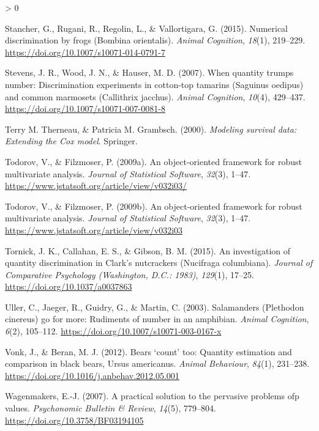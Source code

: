 \documentclass[
  english,
  ,doc,floatsintext]{apa6}
\newlength{\cslhangindent}
\newenvironment{CSLReferences}[2] %
 {%
  \setlength{\parindent}{0pt}
  \ifodd #1 \everypar{\setlength{\hangindent}{\cslhangindent}}\ignorespaces\fi
  \ifnum #2 > 0
  \setlength{\parskip}{#2\baselineskip}
  \fi
 }%
 {}
\begin{document}
\begin{CSLReferences}{1}{0}
\leavevmode\hypertarget{ref-Stancher.etal.2015}{}%
Stancher, G., Rugani, R., Regolin, L., \& Vallortigara, G. (2015). Numerical discrimination by frogs ({Bombina} orientalis). \emph{Animal Cognition}, \emph{18}(1), 219--229. \url{https://doi.org/10.1007/s10071-014-0791-7}

\leavevmode\hypertarget{ref-Stevens.etal.2007}{}%
Stevens, J. R., Wood, J. N., \& Hauser, M. D. (2007). When quantity trumps number: Discrimination experiments in cotton-top tamarins ({Saguinus} oedipus) and common marmosets ({Callithrix} jacchus). \emph{Animal Cognition}, \emph{10}(4), 429--437. \url{https://doi.org/10.1007/s10071-007-0081-8}

\leavevmode\hypertarget{ref-R-survival-book}{}%
Terry M. Therneau, \& Patricia M. Grambsch. (2000). \emph{Modeling survival data: Extending the {C}ox model}. Springer.

\leavevmode\hypertarget{ref-R-robustbase}{}%
Todorov, V., \& Filzmoser, P. (2009a). An object-oriented framework for robust multivariate analysis. \emph{Journal of Statistical Software}, \emph{32}(3), 1--47. \url{https://www.jstatsoft.org/article/view/v032i03/}

\leavevmode\hypertarget{ref-R-rrcov}{}%
Todorov, V., \& Filzmoser, P. (2009b). An object-oriented framework for robust multivariate analysis. \emph{Journal of Statistical Software}, \emph{32}(3), 1--47. \url{https://www.jstatsoft.org/article/view/v032i03}

\leavevmode\hypertarget{ref-Tornick.etal.2015}{}%
Tornick, J. K., Callahan, E. S., \& Gibson, B. M. (2015). An investigation of quantity discrimination in {Clark}'s nutcrackers ({Nucifraga} columbiana). \emph{Journal of Comparative Psychology (Washington, D.C.: 1983)}, \emph{129}(1), 17--25. \url{https://doi.org/10.1037/a0037863}

\leavevmode\hypertarget{ref-Uller.etal.2003}{}%
Uller, C., Jaeger, R., Guidry, G., \& Martin, C. (2003). Salamanders ({Plethodon} cinereus) go for more: Rudiments of number in an amphibian. \emph{Animal Cognition}, \emph{6}(2), 105--112. \url{https://doi.org/10.1007/s10071-003-0167-x}

\leavevmode\hypertarget{ref-Vonk.Beran.2012}{}%
Vonk, J., \& Beran, M. J. (2012). Bears {`count'} too: Quantity estimation and comparison in black bears, {Ursus} americanus. \emph{Animal Behaviour}, \emph{84}(1), 231--238. \url{https://doi.org/10.1016/j.anbehav.2012.05.001}

\leavevmode\hypertarget{ref-Wagenmakers.2007}{}%
Wagenmakers, E.-J. (2007). A practical solution to the pervasive problems ofp values. \emph{Psychonomic Bulletin \& Review}, \emph{14}(5), 779--804. \url{https://doi.org/10.3758/BF03194105}


\end{CSLReferences}
\end{document}
